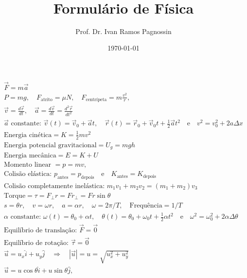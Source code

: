\documentclass[a4paper,10pt,oneside]{scrartcl}
\title{Formulário de Física}
\author{Prof. Dr. Ivan Ramos Pagnossin}
\date{\today}
\begin{document}
	\begin{gather*}
		\vec F = m\vec a \\
		P = mg, \quad F_\text{atrito} = \mu N, \quad F_\text{centrípeta} = m\frac{v^2}{r},\\
		\vec v = \frac{d\vec r}{dt}, \quad \vec a = \frac{d\vec v}{dt} = \frac{d^2\vec r}{dt^2} \\
		\text{$\vec a$ constante: } \vec v(t) = \vec v_0 + \vec a t, \quad \vec r(t) = \vec r_0 + \vec v_0 t + \frac{1}{2} \vec a t^2 \quad\text{e}\quad
		v^2 = v_0^2 + 2a\Delta x\\
		\text{Energia cinética} = K = \frac{1}{2}mv^2\\
		\text{Energia potencial gravitacional} = U_g = mgh \\
		\text{Energia mecânica} = E = K + U \\
		\text{Momento linear } = p = mv,\\
		\text{Colisão elástica: } p_\text{antes} = p_\text{depois} \quad\text{e}\quad K_\text{antes} = K_\text{depois}\\
		\text{Colisão completamente inelástica: } m_1 v_1 + m_2 v_2 = (m_1 + m_2) v_3 \\
		\text{Torque} = \tau = F_\perp r = F r_\perp = F r \sin\theta \\
		s = \theta r, \quad v = \omega r, \quad a = \alpha r, \quad \omega = 2\pi/T, \quad \text{Frequência} = 1/T\\
		\text{$\alpha$ constante: }\omega(t) = \theta_0 + \alpha t, \quad \theta(t) = \theta_0 + \omega_0 t + \frac{1}{2} \alpha t^2 \quad\text{e}\quad \omega^2 = \omega_0^2 + 2\alpha \Delta\theta\\
		\text{Equilíbrio de translação: } \vec F = \vec 0 \\
		\text{Equilíbrio de rotação: } \vec\tau = \vec 0 \\
		\vec u = u_x\hat i + u_y\hat j \quad\Rightarrow\quad |\vec u| = u = \sqrt{u_x^2 + u_y^2} \\
		\vec u = u\cos\theta \hat i + u\sin\theta \hat j,\\
	\end{gather*}
\end{document}
